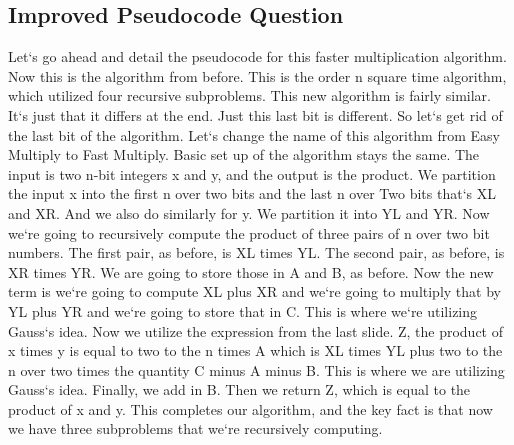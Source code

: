 \subsection{Improved  Pseudocode Question}
Let`s go ahead and detail the pseudocode for this faster multiplication algorithm.
Now this is the algorithm from before.
This is the order n square time algorithm, which utilized four recursive subproblems.
This new algorithm is fairly similar.
It`s just that it differs at the end.
Just this last bit is different.
So let`s get rid of the last bit of the algorithm.
Let`s change the name of this algorithm from Easy Multiply to Fast Multiply.
Basic set up of the algorithm stays the same.
The input is two n-bit integers x and y, and the output is the product.
We partition the input x into the first n over two bits and the last n over Two bits that`s XL and XR\@.
And we also do similarly for y.
We partition it into YL and YR\@.
Now we`re going to recursively compute the product of three pairs of n over two bit numbers.
The first pair, as before, is XL times YL\@.
The second pair, as before, is XR times YR\@.
We are going to store those in A and B, as before.
Now the new term is we`re going to compute XL plus XR and we`re going to multiply that by YL plus YR and we`re going to store that in C\@.
This is where we`re utilizing Gauss`s idea.
Now we utilize the expression from the last slide.
Z, the product of x times y is equal to two to the n times A which is XL times YL plus two to the n over two times the quantity C minus A minus B\@.
This is where we are utilizing Gauss`s idea.
Finally, we add in B\@.
Then we return Z, which is equal to the product of x and y.
This completes our algorithm, and the key fact is that now we have three subproblems that we`re recursively computing.

